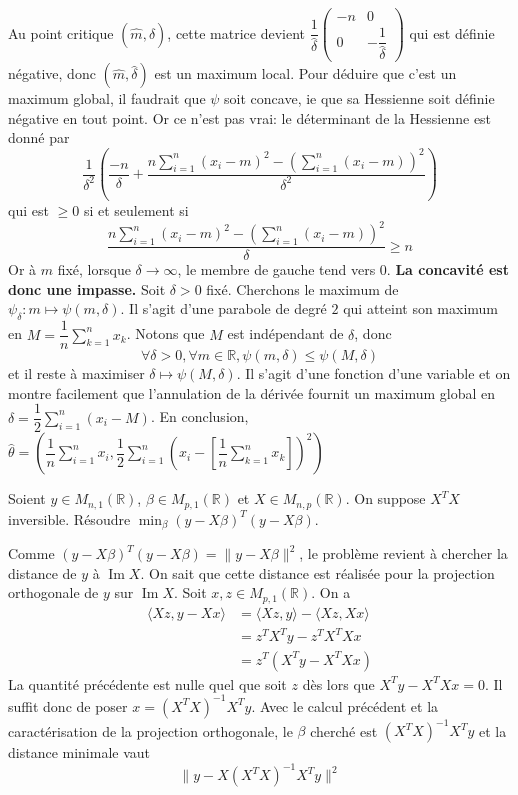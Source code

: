 \documentclass{fancybook}
\DeclareMathOperator{\im}{Im}
\begin{document}
Au point critique $(\hat m, \hat \delta)$, cette matrice devient $\dfrac{1}{\hat \delta} \begin{pmatrix}
-n & 0 \\
0 & -\dfrac{1}{\hat \delta}
\end{pmatrix}$ qui est définie négative, donc $(\hat m, \hat \delta)$ est un maximum local. \newline
Pour déduire que c'est un maximum global, il faudrait que $\psi$ soit concave, ie que sa Hessienne soit définie négative en tout point. Or ce n'est pas vrai: le déterminant de la Hessienne est donné par $$\dfrac{1}{\delta^2}\left(\dfrac{-n}{\delta} + \dfrac{n \sum_{i=1}^n (x_i-m)^2 - \left(\sum_{i=1}^n(x_i-m) \right)^2}{\delta^2}\right)$$ qui est $\geq 0$ si et seulement si $$\dfrac{n \sum_{i=1}^n (x_i-m)^2 - \left(\sum_{i=1}^n(x_i-m) \right)^2}{\delta}\geq n$$
Or à $m$ fixé, lorsque $\delta \to \infty$, le membre de gauche tend vers $0$.\newline
\textbf{La concavité est donc une impasse.}\newline \newline 
Soit $\delta >0$ fixé. Cherchons le maximum de $\psi_\delta: m\mapsto \psi(m,\delta)$. Il s'agit d'une parabole de degré $2$ qui atteint son maximum en $M = \dfrac{1}{n}\sum_{k=1}^n x_k$. Notons que $M$ est indépendant de $\delta$, donc $$\forall \delta >0, \forall m\in \mathbb R, \psi(m,\delta)\leq \psi(M,\delta)$$
et il reste à maximiser $\delta \mapsto \psi(M,\delta)$. Il s'agit d'une fonction d'une variable et on montre facilement que l'annulation de la dérivée fournit un maximum global en $\delta = \dfrac 12 \sum_{i=1}^n (x_i - M)$.\newline
En conclusion, $\hat \theta  = (\dfrac{1}{n}\sum_{i=1}^n x_i, \dfrac{1}{2}\sum_{i=1}^n \left(x_i - \left[\dfrac{1}{n}\sum_{k=1}^n x_k \right]\right)^2)$

\begin{exercice}
Soient $y\in M_{n,1}(\mathbb R)$, $\beta\in M_{p,1}(\mathbb R)$ et $X\in M_{n,p}(\mathbb R)$. On suppose $X^TX$ inversible.\newline
Résoudre $\min_{\beta} (y-X\beta)^T(y-X\beta) $.
\end{exercice}
Comme $(y-X\beta)^T(y-X\beta)= \|y-X\beta\|^2$, le problème revient à chercher la distance de $y$ à $\im X$.\newline
On sait que cette distance est réalisée pour la projection orthogonale de $y$ sur $\im X$. Soit $x,z \in M_{p,1}(\mathbb R)$. On a 
$$\begin{aligned}
\langle Xz, y - Xx \rangle &= \langle Xz,y \rangle - \langle Xz,Xx \rangle \\
&= z^TX^Ty - z^TX^TXx\\ 
&= z^T(X^Ty - X^TXx)
\end{aligned}$$
La quantité précédente est nulle quel que soit $z$ dès lors que $X^Ty - X^TXx=0$. Il suffit donc de poser $x=(X^TX)^{-1}X^Ty$.\newline
Avec le calcul précédent et la caractérisation de la projection orthogonale, le $\beta$ cherché est $(X^TX)^{-1}X^Ty$ et la distance minimale vaut $$\|y-X(X^TX)^{-1}X^Ty\|^2$$
\end{document}
